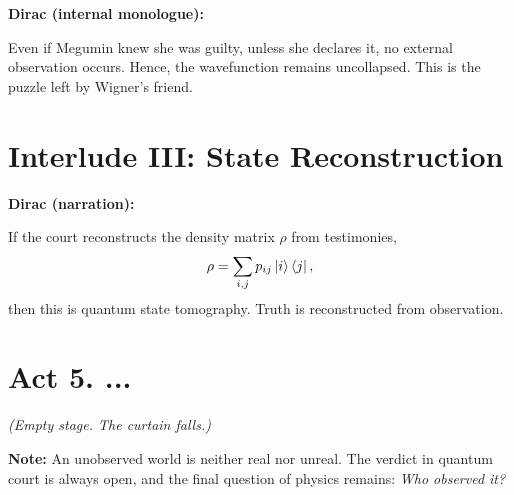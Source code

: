 \documentclass[12pt]{article}
\begin{document}
\textbf{Dirac (internal monologue):}

Even if Megumin knew she was guilty, unless she declares it, no external observation occurs. Hence, the wavefunction remains uncollapsed. This is the puzzle left by Wigner's friend\cite{zurek2002decoherence}.

\section*{Interlude III: State Reconstruction}

\textbf{Dirac (narration):}

If the court reconstructs the density matrix $\rho$ from testimonies\cite{nielsen2010quantum},
\[
\rho = \sum_{i,j} p_{ij} \ket{i}\bra{j},
\]
then this is quantum state tomography. Truth is reconstructed from observation\cite{zurek2002decoherence}.

\section*{Act 5. ...}

\textit{(Empty stage. The curtain falls.)}

\textbf{Note:} An unobserved world is neither real nor unreal. The verdict in quantum court is always open, and the final question of physics remains: \emph{Who observed it?}\cite{carroll2004introduction}

\newpage



\end{document}
